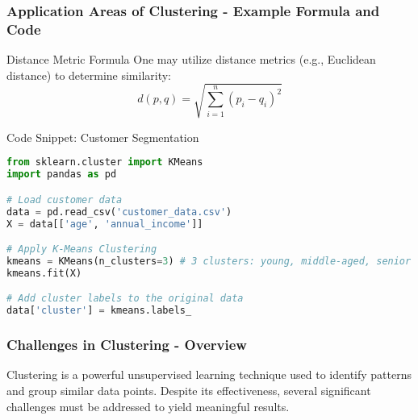 \documentclass[aspectratio=169]{beamer}
\begin{document}
\begin{frame}[fragile]
    \frametitle{Application Areas of Clustering - Example Formula and Code}
    \begin{block}{Distance Metric Formula}
        One may utilize distance metrics (e.g., Euclidean distance) to determine similarity:
        \begin{equation}
            d(p, q) = \sqrt{\sum_{i=1}^{n} (p_i - q_i)^2}
        \end{equation}
    \end{block}

    \begin{block}{Code Snippet: Customer Segmentation}
        \begin{lstlisting}[language=Python]
from sklearn.cluster import KMeans
import pandas as pd

# Load customer data
data = pd.read_csv('customer_data.csv')
X = data[['age', 'annual_income']]

# Apply K-Means Clustering
kmeans = KMeans(n_clusters=3) # 3 clusters: young, middle-aged, senior
kmeans.fit(X)

# Add cluster labels to the original data
data['cluster'] = kmeans.labels_
        \end{lstlisting}
    \end{block}
\end{frame}

\begin{frame}[fragile]
  \frametitle{Challenges in Clustering - Overview}
  Clustering is a powerful unsupervised learning technique used to identify patterns and group similar data points. Despite its effectiveness, several significant challenges must be addressed to yield meaningful results.
\end{frame}
\end{document}
